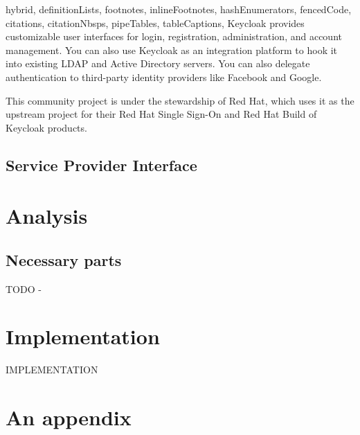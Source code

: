 \documentclass[
  digital,     %
  oneside,     %
  nosansbold,  %
  nocolorbold, %
  lof,         %
  lot,         %
]{fithesis4}
\begin{document}
\begin{markdown*}{%
  hybrid,
  definitionLists,
  footnotes,
  inlineFootnotes,
  hashEnumerators,
  fencedCode,
  citations,
  citationNbsps,
  pipeTables,
  tableCaptions,
}
Keycloak provides customizable user interfaces for login, registration, administration, and account management.
You can also use Keycloak as an integration platform to hook it into existing LDAP and Active Directory servers.
You can also delegate authentication to third-party identity providers like Facebook and Google.

This community project is under the stewardship of Red Hat, which uses it as the upstream project for their Red Hat Single Sign-On and Red Hat Build of Keycloak products.


\section{Service Provider Interface}

\chapter{Analysis}
\shorthandoff{-}


\section{Necessary parts}
TODO -


\shorthandon{-}


\chapter{Implementation}
\shorthandoff{-}

IMPLEMENTATION
\end{markdown*}
\shorthandon{-}

\printbibliography[heading=bibintoc] %

\appendix %
\chapter{An appendix}
\end{document}
